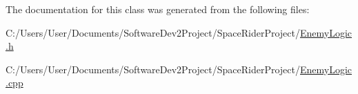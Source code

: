 The documentation for this class was generated from the following files\+:\begin{DoxyCompactItemize}
\item 
C\+:/\+Users/\+User/\+Documents/\+Software\+Dev2\+Project/\+Space\+Rider\+Project/\hyperlink{_enemy_logic_8h}{Enemy\+Logic.\+h}\item 
C\+:/\+Users/\+User/\+Documents/\+Software\+Dev2\+Project/\+Space\+Rider\+Project/\hyperlink{_enemy_logic_8cpp}{Enemy\+Logic.\+cpp}\end{DoxyCompactItemize}
